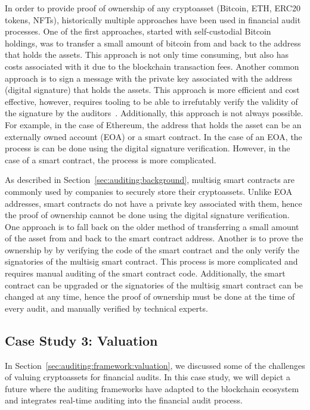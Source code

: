 In order to provide proof of ownership of any cryptoasset (\eg Bitcoin, ETH, ERC20 tokens, NFTs), historically multiple approaches have been used in financial audit processes. One of the first approaches, started with self-custodial Bitcoin holdings, was to transfer a small amount of bitcoin from and back to the address that holds the assets. This approach is not only time consuming, but also has costs associated with it due to the blockchain transaction fees. Another common approach is to sign a message with the private key associated with the address (\eg digital signature) that holds the assets. This approach is more efficient and cost effective, however, requires tooling to be able to irrefutably verify the validity of the signature by the auditors~\cite{gavinwrightcourt}. Additionally, this approach is not always possible. For example, in the case of Ethereum, the address that holds the asset can be an externally owned account (EOA) or a smart contract. In the case of an EOA, the process is can be done using the digital signature verification. However, in the case of a smart contract, the process is more complicated. 

As described in Section~\ref{sec:auditing:background}, multisig smart contracts are commonly used by companies to securely store their cryptoassets. Unlike EOA addresses, smart contracts do not have a private key associated with them, hence the proof of ownership cannot be done using the digital signature verification. One approach is to fall back on the older method of transferring a small amount of the asset from and back to the smart contract address. Another is to prove the ownership by by verifying the code of the smart contract and the only verify the signatories of the multisig smart contract. This process is more complicated and requires manual auditing of the smart contract code. Additionally, the smart contract can be upgraded or the signatories of the multisig smart contract can be changed at any time, hence the proof of ownership must be done at the time of every audit, and manually verified by technical experts.









\subsection{Case Study 3: Valuation} \label{sec:auditing:case-studies:valuation}
In Section~\ref{sec:auditing:framework:valuation}, we discussed some of the challenges of valuing cryptoassets for financial audits. In this case study, we will depict a future where the auditing frameworks have adapted to the blockchain ecosystem and integrates real-time auditing into the financial audit process. 

